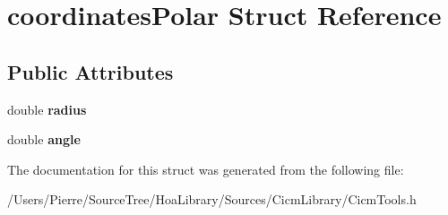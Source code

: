 \hypertarget{structcoordinates_polar}{\section{coordinates\-Polar Struct Reference}
\label{structcoordinates_polar}
}
\subsection*{Public Attributes}
\begin{DoxyCompactItemize}
\item 
\hypertarget{structcoordinates_polar_a64d277d5aa5ef7195af3c0cb3577b852}{double {\bfseries radius}}\label{structcoordinates_polar_a64d277d5aa5ef7195af3c0cb3577b852}

\item 
\hypertarget{structcoordinates_polar_a56cb0574103030dd26fe132d322f3191}{double {\bfseries angle}}\label{structcoordinates_polar_a56cb0574103030dd26fe132d322f3191}

\end{DoxyCompactItemize}


The documentation for this struct was generated from the following file\-:\begin{DoxyCompactItemize}
\item 
/\-Users/\-Pierre/\-Source\-Tree/\-Hoa\-Library/\-Sources/\-Cicm\-Library/Cicm\-Tools.\-h\end{DoxyCompactItemize}
